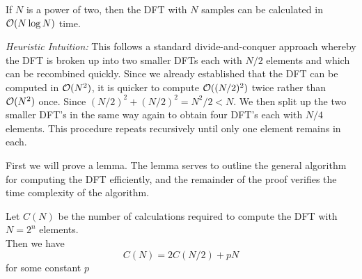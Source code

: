 \begin{theorem}
    If $N$ is a power of two, then the DFT with $N$ samples can be calculated in $\mathcal O(N\log N)$ time.
\end{theorem}

\noindent\textit{Heuristic Intuition:}\lvm
This follows a standard divide-and-conquer approach whereby the DFT is broken up into two smaller DFTs each with $N/2$ elements and which can be recombined quickly. Since we already established that the DFT can be computed in $\mathcal O(N^2)$, it is quicker to compute $\mathcal O((N/2)^2)$ twice rather than $\mathcal O(N^2)$ once. Since $(N/2)^2 + (N/2)^2 = N^2/2 < N$. We then split up the two smaller DFT's in the same way again to obtain four DFT's each with $N/4$ elements. This procedure repeats recursively until only one element remains in each.

First we will prove a lemma. The lemma serves to outline the general algorithm for computing the DFT efficiently, and the remainder of the proof verifies the time complexity of the algorithm.

\begin{lemma}
    Let $C(N)$ be the number of calculations required to compute the DFT with $N = 2^n$ elements.\\
    Then we have
    \begin{equation}
        C(N) = 2 C(N/2) + pN \label{eq:fftlem}
    \end{equation}
    for some constant $p$
\end{lemma}

